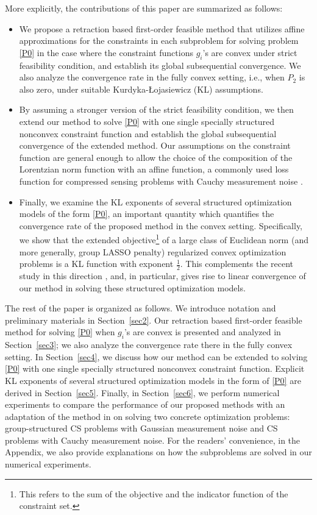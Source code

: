 \documentclass[10pt]{article}
\numberwithin{equation}{section}
\begin{document}
More explicitly, the contributions of this paper are summarized as follows:
\begin{itemize}
  \item We propose a retraction based first-order feasible method that utilizes affine approximations for the constraints in each subproblem for solving problem \eqref{P0} in the case where the constraint functions $g_i$'s are convex under strict feasibility condition, and establish its global subsequential convergence. We also analyze the convergence rate in the fully convex setting, i.e., when $P_2$ is also zero, under suitable Kurdyka-{\L}ojasiewicz (KL) assumptions.
  \item By assuming {\color{blue} a stronger version of the strict feasibility condition}, we then extend our method to solve \eqref{P0} with one single specially structured nonconvex constraint function and establish the global subsequential convergence of the extended method. Our assumptions on the constraint function are general enough to allow the choice of the composition of the Lorentzian norm function with an affine function, a commonly used loss function for compressed sensing problems with Cauchy measurement noise \cite{CaBA10}.
  \item Finally, we examine the KL exponents of several structured optimization models of the form \eqref{P0}, an important quantity which quantifies the convergence rate of the proposed method in the convex setting. Specifically, we show that the extended objective\footnote{This refers to the sum of the objective and the indicator function of the constraint set.} of a large class of Euclidean norm (and more generally, group LASSO penalty) regularized convex optimization problems is a KL function with exponent $\frac12$. This complements the recent study in this direction \cite{LiPong18,YuLiPo19,YuLP20,ZYuP20}, and, in particular, gives rise to linear convergence of our method in solving these structured optimization models.
\end{itemize}

The rest of the paper is organized as follows. We introduce notation and preliminary materials in Section~\ref{sec2}. Our retraction based first-order feasible method for solving \eqref{P0} when $g_i$'s are convex is presented and analyzed in Section~\ref{sec3}; we also analyze the convergence rate there in the fully convex setting. In Section~\ref{sec4}, we discuss how our method can be extended to solving \eqref{P0} with one single specially structured nonconvex constraint function. Explicit KL exponents of several structured optimization models in the form of \eqref{P0} are derived in Section~\ref{sec5}. Finally, in Section~\ref{sec6}, we perform numerical experiments to compare the performance of our proposed methods with an adaptation of the method in \cite{Au13} on solving two concrete optimization problems: group-structured CS problems with Gaussian measurement noise and CS problems with Cauchy measurement noise. For the readers' convenience, in the Appendix, we also provide explanations on how the subproblems are solved in our numerical experiments.
\end{document}
